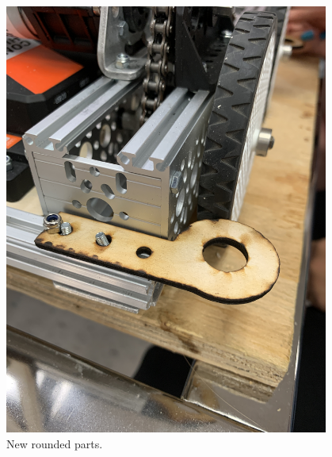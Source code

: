 \begin{figure}[ht]
\begin{minipage}[b]{.48\textwidth}
  \includegraphics[width=0.95\textwidth]{Meetings/October/10-12-21/10-12-21_Team_Figure2 - Nathan Forrer.JPG}
  \caption{New rounded parts.}
  \label{fig:pic2}
\end{minipage}
\end{figure}

